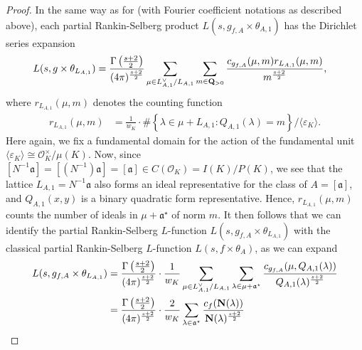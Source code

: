 \documentclass{amsart}
\theoremstyle{definition}
\begin{document}
\begin{proof} 

In the same way as for \cite[$\S 4$, (4.24)]{BY} (with Fourier coefficient notations as described above), 
each partial Rankin-Selberg product $L(s, g_{f, A} \times \theta_{A, 1})$ has the Dirichlet series expansion 
\begin{equation*}\begin{aligned} L(s, g \times \theta_{L_{A, 1}}) &= \frac{ \Gamma \left( \frac{s +2}{2} \right)  }{ (4 \pi)^{\frac{s+2}{2}}} 
\sum\limits_{ \mu \in L_{A,1}^{\vee}/ L_{A,1} } \sum\limits_{ m \in {\bf{Q}}_{>0} } \frac{ c_{g_{f, A}}(\mu, m) 
r_{ L_{A,1}}(\mu, m)}{ m^{  \frac{s + 2}{2}  }}, \end{aligned}\end{equation*} 
where $r_{ L_{A,1}}(\mu, m)$ denotes the counting function 
\begin{align*} r_{ L_{A,1}}(\mu, m) 
&= \frac{1}{w_K} \cdot \# \left\lbrace \lambda \in \mu + L_{A,1}: Q_{A, 1}(\lambda) = m \right\rbrace / \langle \varepsilon_K \rangle. \end{align*}
Here again, we fix a fundamental domain for the action of the fundamental unit $\langle \varepsilon_K \rangle \cong \mathcal{O}_K^{\times}/\mu(K)$. 
Now, since $[N^{-1} \mathfrak{a}] = [(N^{-1}) \mathfrak{a}] = [\mathfrak{a}] \in C(\mathcal{O}_K) = I(K)/P(K)$,
we see that the lattice $L_{A,1} = N^{-1} \mathfrak{a}$ also forms an ideal representative for the class of $A = [\mathfrak{a}]$, 
and $Q_{A,1}(x, y)$ is a binary quadratic form representative. Hence,
$r_{L_{A,1}}(\mu, m)$ counts the number of ideals in $\mu + \mathfrak{a}^{\star}$ of norm $m$. 
It then follows that we can identify the partial Rankin-Selberg $L$-function
$L(s, g_{f, A} \times \theta_{L_{A, 1}})$ with the classical partial Rankin-Selberg $L$-function $L(s, f \times \theta_A)$, as we can expand 
\begin{equation*}\begin{aligned} L(s, g_{f, A} \times \theta_{L_{A, 1}}) 
&= \frac{ \Gamma \left( \frac{s +2}{2} \right)  }{ (4 \pi)^{\frac{s+2}{2}}} \cdot \frac{1}{w_K} \sum\limits_{ \mu \in L_{A,1}^{\vee}/ L_{A,1} } 
\sum\limits_{ \lambda \in \mu + \mathfrak{a}^{\star} } \frac{ c_{g_{f, A}}(\mu, Q_{A,1}(\lambda)) }{ Q_{A,1}(\lambda)^{  \frac{s + 2}{2}  }} \\ 
&=  \frac{ \Gamma \left( \frac{s +2}{2} \right)  }{ (4 \pi)^{\frac{s+2}{2}}} \cdot \frac{2}{w_K}
\sum\limits_{\lambda \in \mathfrak{a}^{\star}} \frac{c_{f}( {\bf{N}}(\lambda) ) }{ {\bf{N}}(\lambda)^{\frac{s+2}{2}}  }

\end{aligned}
\end{equation*}
\end{proof}
\end{document}
